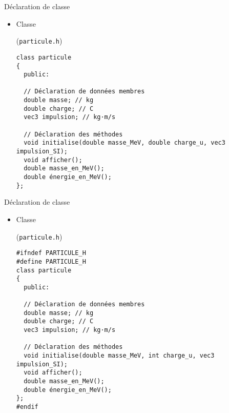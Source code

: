 \documentclass[c]{beamer}
\begin{document}

\begin{frame}[fragile]{Déclaration de classe}
 \begin{itemize}
\item Classe 
\begin{cbox}[][lwuc](\texttt{particule.h})
  \begin{verbatim}
class particule
{
  public:

  // Déclaration de données membres
  double masse; // kg
  double charge; // C
  vec3 impulsion; // kg·m/s

  // Déclaration des méthodes
  void initialise(double masse_MeV, double charge_u, vec3 impulsion_SI);
  void afficher();
  double masse_en_MeV();
  double énergie_en_MeV();
};
\end{verbatim}
\end{cbox}
\end{itemize}
\end{frame}


\begin{frame}[fragile]{Déclaration de classe}
 \begin{itemize}
\item Classe 
\begin{cbox}[][lwuc](\texttt{particule.h})
  \begin{verbatim}
#ifndef PARTICULE_H
#define PARTICULE_H    
class particule
{
  public:

  // Déclaration de données membres
  double masse; // kg
  double charge; // C
  vec3 impulsion; // kg·m/s

  // Déclaration des méthodes
  void initialise(double masse_MeV, int charge_u, vec3 impulsion_SI);
  void afficher();
  double masse_en_MeV();
  double énergie_en_MeV();
};
#endif
\end{verbatim}
\end{cbox}
\end{itemize}
\end{frame}

 
\end{document}
